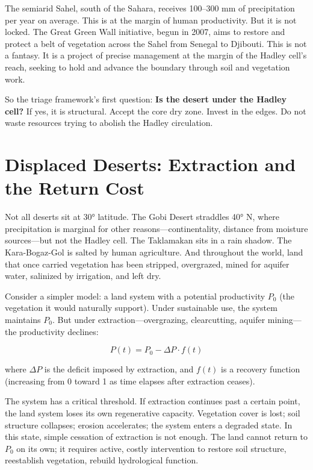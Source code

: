\documentclass[12pt,a4paper]{article}
\begin{document}
The semiarid Sahel, south of the Sahara, receives 100–300 mm of precipitation per year on average. This is at the margin of human productivity. But it is not locked. The Great Green Wall initiative, begun in 2007, aims to restore and protect a belt of vegetation across the Sahel from Senegal to Djibouti. This is not a fantasy. It is a project of precise management at the margin of the Hadley cell's reach, seeking to hold and advance the boundary through soil and vegetation work.

So the triage framework's first question: \textbf{Is the desert under the Hadley cell?} If yes, it is structural. Accept the core dry zone. Invest in the edges. Do not waste resources trying to abolish the Hadley circulation.

\section{Displaced Deserts: Extraction and the Return Cost}

Not all deserts sit at 30° latitude. The Gobi Desert straddles 40° N, where precipitation is marginal for other reasons—continentality, distance from moisture sources—but not the Hadley cell. The Taklamakan sits in a rain shadow. The Kara-Bogaz-Gol is salted by human agriculture. And throughout the world, land that once carried vegetation has been stripped, overgrazed, mined for aquifer water, salinized by irrigation, and left dry.

Consider a simpler model: a land system with a potential productivity $P_0$ (the vegetation it would naturally support). Under sustainable use, the system maintains $P_0$. But under extraction—overgrazing, clearcutting, aquifer mining—the productivity declines:

\begin{equation}
P(t) = P_0 - \Delta P \cdot f(t)
\end{equation}

where $\Delta P$ is the deficit imposed by extraction, and $f(t)$ is a recovery function (increasing from 0 toward 1 as time elapses after extraction ceases).

The system has a critical threshold. If extraction continues past a certain point, the land system loses its own regenerative capacity. Vegetation cover is lost; soil structure collapses; erosion accelerates; the system enters a degraded state. In this state, simple cessation of extraction is not enough. The land cannot return to $P_0$ on its own; it requires active, costly intervention to restore soil structure, reestablish vegetation, rebuild hydrological function.
\end{document}
